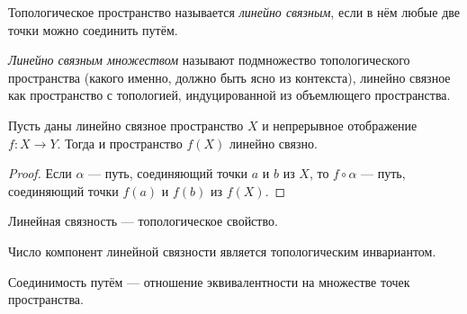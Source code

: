 \documentclass[12pt,a4paper]{article}
\begin{document}
    \begin{definition}
        Топологическое пространство называется \emph{линейно связным}, если в нём любые две точки можно соединить путём.
    \end{definition}

    \begin{remark*}
        \emph{Линейно связным множеством} называют подмножество топологического пространства (какого именно, должно быть ясно из контекста), линейно связное как пространство с топологией, индуцированной из объемлющего пространства.
    \end{remark*}

    \begin{theorem}
        Пусть даны линейно связное пространство $X$ и непрерывное отображение $f: X \to Y$. Тогда и пространство $f(X)$ линейно связно.
    \end{theorem}

    \begin{proof}
        Если $\alpha$ --- путь, соединяющий точки $a$ и $b$ из $X$, то $f \circ \alpha$ --- путь, соединяющий точки $f(a)$ и $f(b)$ из $f(X)$.
    \end{proof}

    \begin{corollary}
        Линейная связность --- топологическое свойство.
    \end{corollary}
    
    \begin{corollary}
        Число компонент линейной связности является топологическим инвариантом.
    \end{corollary}

    \begin{lemma}
        Соединимость путём --- отношение эквивалентности на множестве точек пространства.
    \end{lemma}
\end{document}
